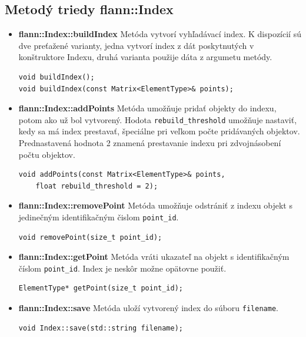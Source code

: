 \documentclass[12pt,oneside]{fithesis2}
\begin{document}
	\subsection{Metodý triedy flann::Index} 
\begin{itemize}
	\item \textbf{flann::Index::buildIndex} Metóda vytvorí vyhľadávací index. K dispozícií sú dve preťažené varianty, jedna vytvorí index z dát poskytnutých v konštruktore Indexu, druhá varianta použije dáta z argumetu metódy. \cite{manual}
{\scriptsize
\begin{lstlisting}
void buildIndex();
void buildIndex(const Matrix<ElementType>& points);
\end{lstlisting}}

	\item \textbf{flann::Index::addPoints} Metóda umožňuje pridať objekty do indexu, potom ako už bol vytvorený. Hodota \texttt{rebuild\_threshold} umožňuje nastaviť, kedy sa má index prestavať, špeciálne pri veľkom počte pridávaných objektov. Prednastavená hodnota 2 znamená prestavanie indexu pri zdvojnásobení počtu objektov. \cite{manual}
{\scriptsize
\begin{lstlisting}
void addPoints(const Matrix<ElementType>& points, 
	float rebuild_threshold = 2);
\end{lstlisting}}	

	\item \textbf{flann::Index::removePoint} Metóda umožňuje odstrániť z indexu objekt s jedinečným identifikačným čislom \texttt{point\_id}. \cite{manual}
{\scriptsize
\begin{lstlisting}
void removePoint(size_t point_id);
\end{lstlisting}}
		
	\item \textbf{flann::Index::getPoint} Metóda vráti ukazateľ na objekt s identifikačným číslom \texttt{point\_id}. Index je neskôr možne opätovne použiť. \cite{manual}
{\scriptsize
\begin{lstlisting}
ElementType* getPoint(size_t point_id);
\end{lstlisting}}	

	\item \textbf{flann::Index::save} Metóda uloží vytvorený index do súboru \texttt{filename}. \cite{manual}
{\scriptsize
\begin{lstlisting}
void Index::save(std::string filename);
\end{lstlisting}}
	

\end{itemize}
\end{document}
